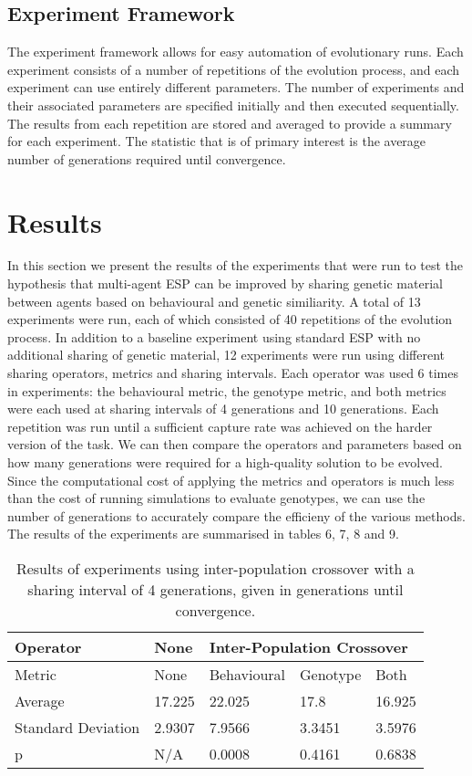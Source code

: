 \documentclass[12pt]{article} %
\begin{document}
\subsection{Experiment Framework}

The experiment framework allows for easy automation of evolutionary runs. Each experiment consists of a number of repetitions of the evolution process, and each experiment can use entirely different parameters. The number of experiments and their associated parameters are specified initially and then executed sequentially. The results from each repetition are stored and averaged to provide a summary for each experiment. The statistic that is of primary interest is the average number of generations required until convergence.

\section{Results}

In this section we present the results of the experiments that were run to test the hypothesis that multi-agent ESP can be improved by sharing genetic material between agents based on behavioural and genetic similiarity. A total of 13 experiments were run, each of which consisted of 40 repetitions of the evolution process. In addition to a baseline experiment using standard ESP with no additional sharing of genetic material, 12 experiments were run using different sharing operators, metrics and sharing intervals. Each operator was used 6 times in experiments: the behavioural metric, the genotype metric, and both metrics were each used at sharing intervals of 4 generations and 10 generations. Each repetition was run until a sufficient capture rate was achieved on the harder version of the task. We can then compare the operators and parameters based on how many generations were required for a high-quality solution to be evolved. Since the computational cost of applying the metrics and operators is much less than the cost of running simulations to evaluate genotypes, we can use the number of generations to accurately compare the efficieny of the various methods. The results of the experiments are summarised in tables 6, 7, 8 and 9.

\begin{table} \centering
    \begin{tabular}{|l|l|l|l|l|}
    \hline
    Operator			& None	& \multicolumn{3}{l|}{Inter-Population Crossover} \\ \hline
    Metric			& None	& Behavioural	& Genotype	& Both  \\ \hline
    Average			& 17.225	& 22.025		& 17.8		& 16.925 \\ \hline
    Standard Deviation	& 2.9307	& 7.9566		& 3.3451	& 3.5976  \\ \hline
    p 				& N/A 		& 0.0008		& 0.4161	& 0.6838  \\ \hline
    \end{tabular}
    \caption{Results of experiments using inter-population crossover with a sharing interval of 4 generations, given in generations until convergence.}
\end{table}
\end{document}
